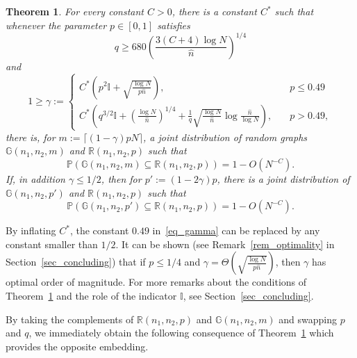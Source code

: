 \documentclass[12pt,reqno]{amsart}
\newcommand{\Prob} {\mathbb {P}}
\newcommand{\prob}[1]{\Prob\left(#1\right)}
\newcommand{\R} {\mathbb R}
\newcommand{\Rnnp}{\R(n_1,n_2,p)}
\newcommand{\G} {\mathbb G}
\newcommand{\Gnnm} {\G(n_1,n_2,m)}
\newcommand{\I} {\mathbb I}
\newtheorem{theorem}{Theorem}
\theoremstyle{definition}
\begin{document}
\begin{theorem}
  \label{thm_embed}
  For every constant $C > 0$, there is a constant $C^*$ such that whenever the parameter $p \in [0,1]$ satisfies
  \begin{equation}
\label{eq:thm_embed_q}
q \ge 680\left( \frac{3(C + 4)\log N}{\hat n}\right)^{1/4}
  \end{equation}
  and
	\begin{equation}
	  \label{eq_gamma}
1\ge\gamma :=
	\begin{cases}
		C^* \left( p^2 \I + \sqrt{\frac{\log N}{p\hat n }}\right), \quad & p \le 0.49 \\
	C^* \left( q^{3/2}\I + \left(\frac{\log N}{\hat n} \right)^{1/4} + \frac1q\sqrt{\frac{\log N}{\hat n}} \log \frac{\hat n}{\log N}\right), \quad & p > 0.49,
	\end{cases}
\end{equation}
there is, for $m := \lceil(1-\gamma)pN\rceil$, a joint distribution of random graphs $\Gnnm$ and $\Rnnp$ such that
\begin{equation}
  \label{eq_lower_embed}
	    \prob{\Gnnm \subseteq \Rnnp} = 1 - O(N^{-C}).
    \end{equation}
    If, in addition $\gamma \le 1/2$, then for $p' := (1 - 2\gamma)p$,
	there is a joint distribution of $\G(n_1,n_2,p')$ and $\Rnnp$ such that
\begin{equation}
\label{eq:embed_Gnp}
  \prob{\G(n_1,n_2,p') \subseteq \Rnnp} = 1 - O(N^{-C}).
    \end{equation}
\end{theorem}
 By inflating $C^*$, the constant $0.49$ in~\eqref{eq_gamma} can be replaced by any constant smaller than $1/2$.
It can be shown (see Remark~\ref{rem_optimality} in Section~\ref{sec_concluding}) that if $p \le 1/4$ and $\gamma = \Theta\left( \sqrt{\frac{\log N}{p\hat n }} \right)$, then $\gamma$ has optimal order of magnitude. For more remarks about the conditions of Theorem~\ref{thm_embed} and the role of the indicator $\I$, see Section~\ref{sec_concluding}.

\medskip
By taking the complements of $\Rnnp$ and $\G(n_1,n_2,m)$ and swapping $p$ and $q$, we immediately obtain the following consequence of Theorem~\ref{thm_embed} which provides the opposite embedding.
\end{document}
